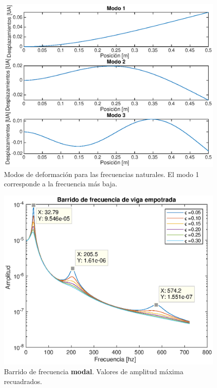 \documentclass[onecolumn,10pt,titlepage,a4paper]{article}
\begin{document}
\begin{figure}[htb!] 
	\centering
	\includegraphics[width=1\textwidth]{fig/modos.eps}
	\caption{Modos de deformación para las frecuencias naturales. El modo 1 corresponde a la frecuencia más baja.}
	\label{fig:modos}
\end{figure}

\begin{figure}[htb!]
	\centering
	\includegraphics[width=1\textwidth]{fig/sinesweep.eps}
	\caption{Barrido de frecuencia \textbf{modal}. Valores de amplitud máxima recuadrados.}
	\label{fig:sinesweepmodal}
\end{figure}
\end{document}
